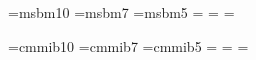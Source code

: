

%

\def\figflag{I}
\def\psheader#1{\special{header=#1}}


\font\blackboard=msbm10 \font\blackboards=msbm7
\font\blackboardss=msbm5
\newfam\black
\textfont\black=\blackboard
\scriptfont\black=\blackboards
\scriptscriptfont\black=\blackboardss
\def\blackb#1{{\fam\black\relax#1}}



%
\def\BC{{\blackb C}} \def\BQ{{\blackb Q}}
\def\BR{{\blackb R}} \def\BI{{\blackb I}}
\def\BZ{{\blackb Z}} \def\BD{{\blackb D}}
\def\BP{{\blackb P}}
\def\BS{{\blackb S}}

%
\font\mathbold=cmmib10 \font\mathbolds=cmmib7
\font\mathboldss=cmmib5
\newfam\mbold
\textfont\mbold=\mathbold
\scriptfont\mbold=\mathbolds
\scriptscriptfont\mbold=\mathboldss
\def\bi{\fam\mbold\relax}


